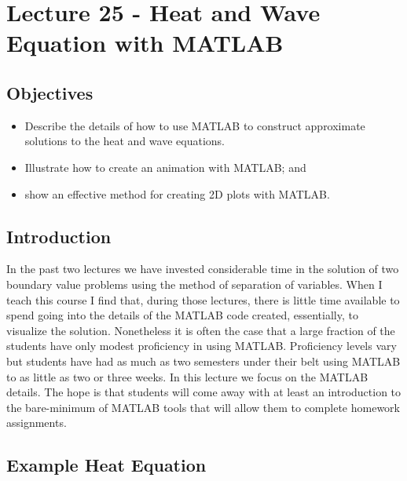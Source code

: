 \chapter{Lecture 25 - Heat and Wave Equation with MATLAB}
\label{ch:lec25}
\section{Objectives}
\begin{itemize}
\item Describe the details of how to use MATLAB to construct approximate solutions to the heat and wave equations.
\item Illustrate how to create an animation with MATLAB; and
\item show an effective method for creating 2D plots with MATLAB.
\end{itemize}
\setcounter{lstannotation}{0} %

\section{Introduction}
In the past two lectures we have invested considerable time in the solution of two boundary value problems using the method of separation of variables.  When I teach this course I find that, during those lectures, there is little time available to spend going into the details of the MATLAB code created, essentially, to visualize the solution. Nonetheless it is often the case that a large fraction of the students have only modest proficiency in using MATLAB.  Proficiency levels vary but students have had as much as two semesters under their belt using MATLAB to as little as two or three weeks.  In this lecture we focus on the MATLAB details.  The hope is that students will come away with at least an introduction to the bare-minimum of MATLAB tools that will allow them to complete homework assignments.

\section{Example Heat Equation}

